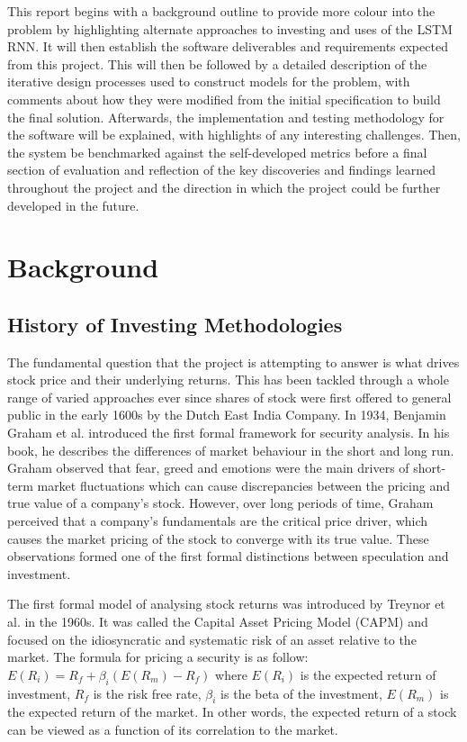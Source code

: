 \documentclass[10pt,onecolumn,letterpaper]{article}
\begin{document}
This report begins with a background outline to provide more colour into the problem by highlighting alternate approaches to investing and uses of the LSTM RNN. It will then establish the software deliverables and requirements expected from this project. This will then be followed by a detailed description of the iterative design processes used to construct models for the problem, with comments about how they were modified from the initial specification to build the final solution. Afterwards, the implementation and testing methodology for the software will be explained, with highlights of any interesting challenges. Then, the system be benchmarked against the self-developed metrics before a final section of evaluation and reflection of the key discoveries and findings learned throughout the project and the direction in which the project could be further developed in the future. 

\newpage

\section{Background}

\subsection{History of Investing Methodologies}  \label{History of Investing Methodologies}
The fundamental question that the project is attempting to answer is what drives stock price and their underlying returns. This has been tackled through a whole range of varied approaches ever since shares of stock were first offered to general public in the early 1600s by the Dutch East India Company\cite{Rouwenhorst}. In 1934, Benjamin Graham et al. introduced the first formal framework for security analysis\cite{Graham}. In his book, he describes the differences of market behaviour in the short and long run. Graham observed that fear, greed and emotions were the main drivers of short-term market fluctuations which can cause discrepancies between the pricing and true value of a company's stock. However, over long periods of time, Graham perceived that a company's fundamentals are the critical price driver, which causes the market pricing of the stock to converge with its true value. These observations formed one of the first formal distinctions between speculation and investment.

The first formal model\cite{Treynor} of analysing stock returns was introduced by Treynor et al. in the 1960s. It was called the Capital Asset Pricing Model (CAPM) and focused on the idiosyncratic and systematic risk of an asset relative to the market. The formula for pricing a security is as follow: $E(R_{i}) = R_{f} + \beta_{i}(E(R_{m}) - R_{f}) $ where $E(R_{i})$ is the expected return of investment, $R_{f}$ is the risk free rate, $\beta_{i}$ is the beta of the investment, $E(R_{m})$ is the expected return of the market. In other words, the expected return of a stock can be viewed as a function of its correlation to the market. 
\end{document}
